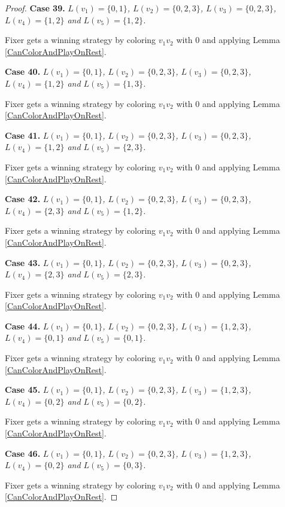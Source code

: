 \documentclass[12pt]{amsart}
\theoremstyle{plain}
\theoremstyle{definition}
\theoremstyle{remark}
\begin{document}
\begin{proof}
\noindent\textbf{Case 39.  }\textit{$L(v_1) = \{0, 1\}$, $L(v_2) = \{0, 2, 3\}$, $L(v_3) = \{0, 2, 3\}$, $L(v_4) = \{1, 2\}$ and $L(v_5) = \{1, 2\}$.}

Fixer gets a winning strategy by coloring $v_1v_2$ with $0$ and applying Lemma \ref{CanColorAndPlayOnRest}.

\noindent\textbf{Case 40.  }\textit{$L(v_1) = \{0, 1\}$, $L(v_2) = \{0, 2, 3\}$, $L(v_3) = \{0, 2, 3\}$, $L(v_4) = \{1, 2\}$ and $L(v_5) = \{1, 3\}$.}

Fixer gets a winning strategy by coloring $v_1v_2$ with $0$ and applying Lemma \ref{CanColorAndPlayOnRest}.

\noindent\textbf{Case 41.  }\textit{$L(v_1) = \{0, 1\}$, $L(v_2) = \{0, 2, 3\}$, $L(v_3) = \{0, 2, 3\}$, $L(v_4) = \{1, 2\}$ and $L(v_5) = \{2, 3\}$.}

Fixer gets a winning strategy by coloring $v_1v_2$ with $0$ and applying Lemma \ref{CanColorAndPlayOnRest}.

\noindent\textbf{Case 42.  }\textit{$L(v_1) = \{0, 1\}$, $L(v_2) = \{0, 2, 3\}$, $L(v_3) = \{0, 2, 3\}$, $L(v_4) = \{2, 3\}$ and $L(v_5) = \{1, 2\}$.}

Fixer gets a winning strategy by coloring $v_1v_2$ with $0$ and applying Lemma \ref{CanColorAndPlayOnRest}.

\noindent\textbf{Case 43.  }\textit{$L(v_1) = \{0, 1\}$, $L(v_2) = \{0, 2, 3\}$, $L(v_3) = \{0, 2, 3\}$, $L(v_4) = \{2, 3\}$ and $L(v_5) = \{2, 3\}$.}

Fixer gets a winning strategy by coloring $v_1v_2$ with $0$ and applying Lemma \ref{CanColorAndPlayOnRest}.

\noindent\textbf{Case 44.  }\textit{$L(v_1) = \{0, 1\}$, $L(v_2) = \{0, 2, 3\}$, $L(v_3) = \{1, 2, 3\}$, $L(v_4) = \{0, 1\}$ and $L(v_5) = \{0, 1\}$.}

Fixer gets a winning strategy by coloring $v_1v_2$ with $0$ and applying Lemma \ref{CanColorAndPlayOnRest}.

\noindent\textbf{Case 45.  }\textit{$L(v_1) = \{0, 1\}$, $L(v_2) = \{0, 2, 3\}$, $L(v_3) = \{1, 2, 3\}$, $L(v_4) = \{0, 2\}$ and $L(v_5) = \{0, 2\}$.}

Fixer gets a winning strategy by coloring $v_1v_2$ with $0$ and applying Lemma \ref{CanColorAndPlayOnRest}.

\noindent\textbf{Case 46.  }\textit{$L(v_1) = \{0, 1\}$, $L(v_2) = \{0, 2, 3\}$, $L(v_3) = \{1, 2, 3\}$, $L(v_4) = \{0, 2\}$ and $L(v_5) = \{0, 3\}$.}

Fixer gets a winning strategy by coloring $v_1v_2$ with $0$ and applying Lemma \ref{CanColorAndPlayOnRest}.


\end{proof}
\end{document}
